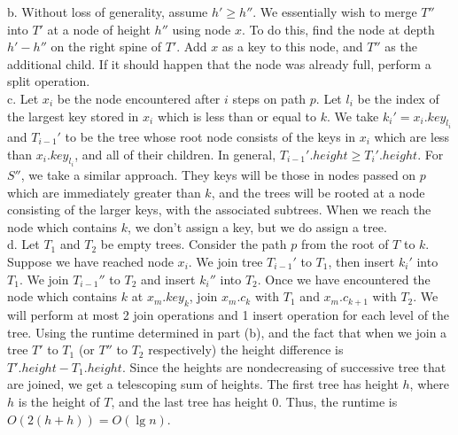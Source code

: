 \documentclass{article}
\begin{document}
\begin{enumerate}[a.]
b. Without loss of generality, assume $h' \geq h''$.  We essentially wish to merge $T''$ into $T'$ at a node of height $h''$ using node $x$.  To do this, find the node at depth $h' - h''$ on the right spine of $T'$.   Add $x$ as a key to this node, and $T''$ as the additional child.  If it should happen that the node was already full, perform a split operation.  \\

c. Let $x_i$ be the node encountered after $i$ steps on path $p$.  Let $l_i$ be the index of the largest key stored in $x_i$ which is less than or equal to $k$. We take $k_i' = x_i.key_{l_i}$ and $T_{i-1}'$ to be the tree whose root node consists of the keys in $x_i$ which are less than $x_i.key_{l_i}$, and all of their children.  In general, $T_{i-1}'.height  \geq T_i'.height$. For $S''$, we take a similar approach. They keys will be those in nodes passed on $p$ which are immediately greater than $k$, and the trees will be rooted at a node consisting of the larger keys, with the associated subtrees. When we reach the node which contains $k$, we don't assign a key, but we do assign a tree.\\

d. Let $T_1$ and $T_2$ be empty trees.  Consider the path $p$ from the root of $T$ to $k$.  Suppose we have reached node $x_i$.  We join tree $T_{i-1}'$ to $T_1$, then insert $k_i'$ into $T_1$.  We join $T_{i-1}''$ to $T_2$ and insert $k_i''$ into $T_2$.  Once we have encountered the node which contains $k$ at $x_m.key_k$, join $x_m.c_k$ with $T_1$ and $x_m.c_{k+1}$ with $T_2$.  We will perform at most 2 join operations and 1 insert operation for each level of the tree.  Using the runtime determined in part (b), and the fact that when we join a tree $T'$ to $T_1$ (or $T''$ to $T_2$ respectively) the height difference is $T'.height - T_1.height$.  Since the heights are nondecreasing of successive tree that are joined, we get a telescoping sum of heights.  The first tree has height $h$, where $h$ is the height of $T$, and the last tree has height 0.  Thus, the runtime is $O(2(h + h)) = O(\lg n)$.


\end{enumerate}
\end{document}
